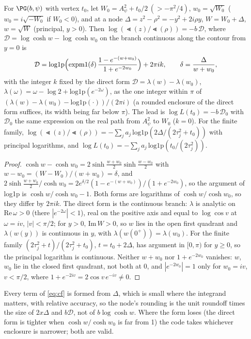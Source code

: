 \begin{proposition}\label{prop:cf}
For $\PG(b,\psi)$ with vertex $t_0$, let $W_0=A_\psi^2+t_0/2\ (>-\pi^2/4)$, $w_0=\sqrt{W_0}$ ($w_0=i\sqrt{-W_0}$ if
$W_0<0$), and at a node $\Delta=z^2-\rho^2=-y^2+2i\rho y$, $W=W_0+\Delta$, $w=\sqrt W$ (principal, $y>0$). Then
$\log(\Lt(z)/\Lt(\rho))=-b\,\mathcal D$, where $\mathcal D=\log\cosh w-\log\cosh w_0$ on the branch continuous
along the contour from $y=0$ is
\begin{equation}\label{eq:cf}
\mathcal D=\mathrm{log1p}\Bigl(\mathrm{expm1}(\delta)\,\frac{1-e^{-(w+w_0)}}{1+e^{-2w_0}}\Bigr)+2\pi ik,\qquad
\delta=\frac{\Delta}{w+w_0},
\end{equation}
with the integer $k$ fixed by the direct form $\mathcal D=\lambda(w)-\lambda(w_0)$,
$\lambda(\omega)=\omega-\log2+\mathrm{log1p}(e^{-2\omega})$, as the one integer within $\pi$ of
$(\lambda(w)-\lambda(w_0)-\mathrm{log1p}(\cdot))/(2\pi i)$ (a rounded enclosure of the direct form suffices, its
width being far below $\pi$). The lead is $\log L(t_0)=-b\,\mathcal D_0$ with $\mathcal D_0$ the same expression
on the real path from $A_\psi^2$ to $W_0$ ($k=0$). For the finite family,
$\log(\Lt(z)/\Lt(\rho))=-\sum_ja_j\,\mathrm{log1p}(2\Delta/(2\tau_j^2+t_0))$ with principal logarithms, and
$\log L(t_0)=-\sum_ja_j\,\mathrm{log1p}(t_0/(2\tau_j^2))$.
\end{proposition}
\begin{proof}
$\cosh w-\cosh w_0=2\sinh\frac{w+w_0}2\sinh\frac{w-w_0}2$ with $w-w_0=(W-W_0)/(w+w_0)=\delta$, and
$2\sinh\frac{w+w_0}2/\cosh w_0=2e^{\delta/2}(1-e^{-(w+w_0)})/(1+e^{-2w_0})$, so the argument of log1p is
$\cosh w/\cosh w_0-1$. Both forms are logarithms of $\cosh w/\cosh w_0$, so they differ by $2\pi ik$. The direct
form is the continuous branch: $\lambda$ is analytic on $\mathrm{Re}\,\omega>0$ (there $|e^{-2\omega}|<1$), real
on the positive axis and equal to $\log\cos v$ at $\omega=iv$, $|v|<\pi/2$; for $y>0$, $\mathrm{Im}\,W>0$, so $w$ lies
in the open first quadrant and $\lambda(w(y))$ is continuous in $y$, with $\lambda(w(0^+))=\lambda(w_0)$. For the
finite family $(2\tau_j^2+t)/(2\tau_j^2+t_0)$, $t=t_0+2\Delta$, has argument in $[0,\pi)$ for $y\ge0$, so the
principal logarithm is continuous. Neither $w+w_0$ nor $1+e^{-2w_0}$ vanishes: $w$, $w_0$ lie in the closed first
quadrant, not both at 0, and $|e^{-2w_0}|=1$ only for $w_0=iv$, $v<\pi/2$, where $1+e^{-2iv}=2\cos v\,e^{-iv}\ne0$.
\end{proof}

Every term of \eqref{eq:cf} is formed from $\Delta$, which is small where the integrand matters, with relative
accuracy, so the node's rounding is the unit roundoff times the size of $2x\Delta$ and $b\mathcal D$, not of
$b\log\cosh w$. Where the form loses (the direct form is tighter when $\cosh w/\cosh w_0$ is far from 1) the code
takes whichever enclosure is narrower; both are valid.

